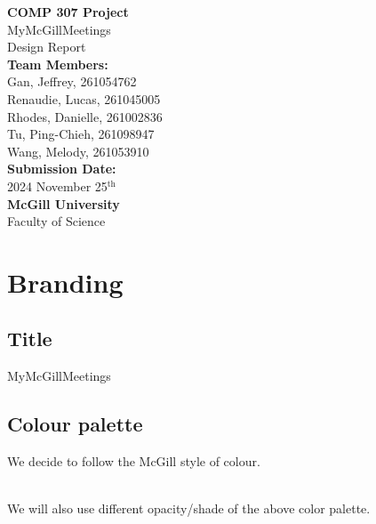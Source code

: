 \documentclass[a4paper,12pt]{article}
\begin{document}
\begin{titlepage}
    \begin{center}
        
        \textbf{\Huge COMP 307 Project}\\[1.5cm]
        \Large MyMcGillMeetings\\
        \Large Design Report\\[2cm]
        
        \textbf{\Large Team Members:}\\
        \Large Gan, Jeffrey, 261054762\\
        \Large Renaudie, Lucas, 261045005\\
        \Large Rhodes, Danielle, 261002836\\
        \Large Tu, Ping-Chieh, 261098947\\
        \Large Wang, Melody, 261053910\\[1.5cm]
        
        \textbf{\Large Submission Date:}\\
        \Large 2024 November 25$^{\text{th}}$ \\[2cm]
        
        \textbf{\Large McGill University}\\
        \Large Faculty of Science\\[1cm]
    \end{center}
\end{titlepage}

\section*{Branding}
\subsection*{Title}
MyMcGillMeetings
\subsection*{Colour palette}
We decide to follow the McGill style of colour.\\
\\
We will also use different opacity/shade of the above color palette.
\end{document}
